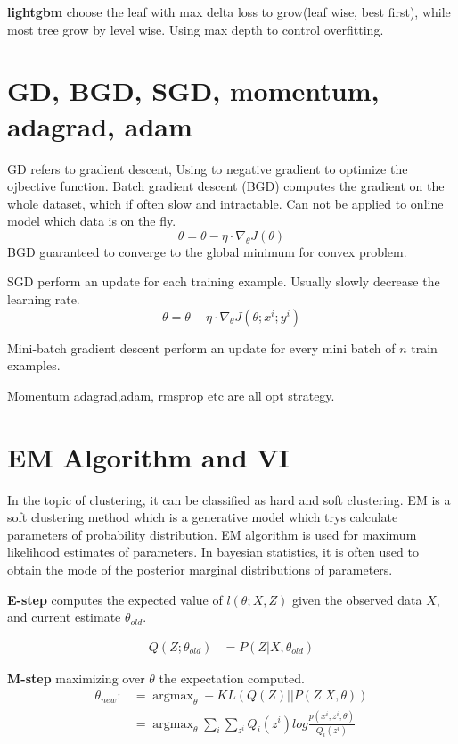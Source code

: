 \documentclass{article}
\begin{document}
\textbf{lightgbm} choose the leaf with max delta loss to grow(leaf wise, best first), while most tree grow by level wise. Using max depth to control overfitting.

\section{GD, BGD, SGD, momentum, adagrad, adam}
GD refers to gradient descent, Using to negative gradient to optimize the ojbective function.
Batch gradient descent (BGD) computes the gradient on the whole dataset, which if often slow and intractable. Can not be applied to online model which data is on the fly. 
$$\theta=\theta - \eta \cdot \nabla_{\theta} J(\theta)$$
BGD guaranteed to converge to the global minimum for convex problem.

SGD perform an update for each training example. Usually slowly decrease the learning rate.
$$\theta=\theta - \eta \cdot \nabla_{\theta} J(\theta; x^{i};y^{i})$$

Mini-batch gradient descent perform an update for every mini batch of $n$ train examples. 

Momentum adagrad,adam, rmsprop etc are all opt strategy.

\section{EM Algorithm and VI}
In the topic of clustering, it can be classified as hard and soft clustering. EM is a soft clustering method which is a generative model which trys calculate parameters of probability distribution. 
EM algorithm is used for maximum likelihood estimates of parameters. In bayesian statistics, it is often used to obtain the mode of the posterior marginal distributions of parameters.

\textbf{E-step} computes the expected value of $l(\theta;X,Z)$ given the observed data $X$, and current estimate $\theta_{old}$.

\begin{align*}
Q(Z;\theta_{old}) &= P(Z| X,\theta_{old})
\end{align*}

\textbf{M-step} maximizing over $\theta$ the expectation computed.
\begin{align*}
\theta_{new} :&= \mathop{\arg\max}_{\theta} -KL(Q(Z) || P(Z|X,\theta)) \\
&= \mathop{\arg\max}_{\theta} \sum_{i}\sum_{z^{i}} Q_{i}(z^{i})log \frac{p(x^{i},z^{i};\theta)}{Q_{i}(z^{i})}
\end{align*}
\end{document}
